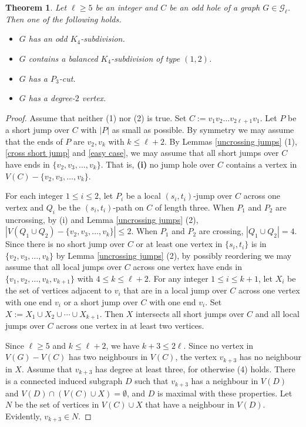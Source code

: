 \documentclass[11pt]{article}
\newtheorem{theorem}{Theorem}[section]
\begin{document}
\begin{theorem}\label{final}
Let $\ell\geq5$ be an integer and $C$ be an odd hole of a graph $G\in \mathcal{G}_{\ell}$. Then one of the following holds.
\begin{itemize}
\item[(1)] $G$ has an odd $K_4$-subdivision.
\item[(2)] $G$ contains a balanced $K_4$-subdivision of type $(1,2)$.
\item[(3)] $G$ has a $P_3$-cut.
\item[(4)] $G$ has a degree-$2$ vertex.
\end{itemize}
\end{theorem}
\begin{proof}
Assume that neither (1) nor (2) is true. Set $C:=v_1v_2\ldots v_{2\ell+1}v_1$. Let $P$ be a short jump over $C$  with $|P|$ as small as possible. By symmetry we may assume that the ends of $P$ are $v_2,v_k$ with $k\leq\ell+2$. By Lemmas \ref{uncrossing jumps} (1), \ref{cross short jump} and \ref{easy case}, we may assume that all short jumps over $C$ have ends in $\{v_2,v_3,\ldots,v_k\}$. That is, {\bf (i)} no jump hole over $C$ contains a vertex in $V(C)-\{v_2,v_3,\ldots,v_k\}$.

For each integer $1\leq i\leq 2$, let $P_i$ be a local $(s_i,t_i)$-jump over $C$ across one vertex and $Q_i$ be the $(s_i,t_i)$-path on $C$ of length three. %
When $P_1$ and $P_2$ are uncrossing, by (i) and Lemma \ref{uncrossing jumps} (2), $|V(Q_1\cup Q_2)-\{v_2,v_3,\ldots,v_k\}|\leq2$. When $P_1$ and $P_2$ are crossing, $|Q_1\cup Q_2|=4$. Since there is no short jump over $C$ or at least one vertex in $\{s_i,t_i\}$ is in $\{v_2,v_3,\ldots,v_k\}$ by Lemma \ref{uncrossing jumps} (2), by possibly reordering we may assume that all local jumps over $C$ across one vertex have ends in $\{v_1,v_2,\ldots, v_k, v_{k+1}\}$ with $4\leq k\leq\ell+2$. For any integer $1\leq i\leq k+1$, let $X_i$ be the set of vertices adjacent to $v_i$ that are in a local jump over $C$ across one vertex with one end $v_i$ or a short jump over $C$ with one end $v_i$.  Set $X:=X_1\cup X_2\cup \cdots \cup X_{k+1}$. Then $X$ intersects all short jumps over $C$ and all local jumps over $C$ across one vertex in at least two vertices.

Since $\ell\geq5$ and $k\leq\ell+2$, we have $k+3\leq 2\ell$.
Since no vertex in $V(G)-V(C)$ has two neighbours in $V(C)$, the vertex $v_{k+3}$ has no neighbour in $X$. Assume that $v_{k+3}$ has degree at least three, for otherwise (4) holds. There is a connected induced subgraph $D$ such that $v_{k+3}$ has a neighbour in $V(D)$ and $V(D)\cap(V(C)\cup X)=\emptyset$, and $D$ is maximal with these properties. Let $N$ be the set of vertices in $V(C)\cup X$ that have a neighbour in $V(D)$. Evidently, $v_{k+3}\in N$.


\end{proof}
\end{document}
